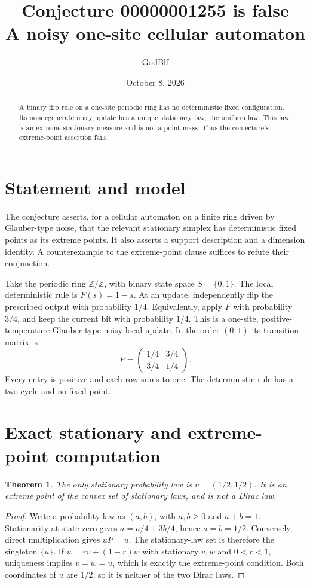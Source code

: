 \documentclass[10pt]{article}
\title{Conjecture 00000001255 is false\\A noisy one-site cellular automaton}
\author{GodBlf}
\date{October 8, 2026}
\newtheorem{theorem}{Theorem}
\begin{document}
\maketitle
\begin{abstract}
A binary flip rule on a one-site periodic ring has no deterministic fixed
configuration. Its nondegenerate noisy update has a unique stationary law,
the uniform law. This law is an extreme stationary measure and is not a
point mass. Thus the conjecture's extreme-point assertion fails.
\end{abstract}
\section{Statement and model}
The conjecture asserts, for a cellular automaton on a finite ring driven by
Glauber-type noise, that the relevant stationary simplex has deterministic
fixed points as its extreme points. It also asserts a support description
and a dimension identity. A counterexample to the extreme-point clause
suffices to refute their conjunction.

Take the periodic ring $\mathbb Z/\mathbb Z$, with binary state space
$S=\{0,1\}$. The local deterministic rule is $F(s)=1-s$.
At an update, independently flip the prescribed output with probability
$1/4$. Equivalently, apply $F$ with probability $3/4$, and keep the current
bit with probability $1/4$. This is a one-site, positive-temperature
Glauber-type noisy local update. In the order $(0,1)$ its transition matrix is
\[
 P=\begin{pmatrix}1/4&3/4\\3/4&1/4\end{pmatrix}.
\]
Every entry is positive and each row sums to one. The deterministic rule
has a two-cycle and no fixed point.

\section{Exact stationary and extreme-point computation}
\begin{theorem}
The only stationary probability law is $u=(1/2,1/2)$. It is an extreme
point of the convex set of stationary laws, and is not a Dirac law.
\end{theorem}
\begin{proof}
Write a probability law as $(a,b)$, with $a,b\geq0$ and $a+b=1$.
Stationarity at state zero gives
$a=a/4+3b/4$, hence $a=b=1/2$. Conversely, direct multiplication gives
$uP=u$. The stationary-law set is therefore the singleton $\{u\}$.
If $u=r v+(1-r)w$ with stationary $v,w$ and $0<r<1$, uniqueness implies
$v=w=u$, which is exactly the extreme-point condition. Both coordinates
of $u$ are $1/2$, so it is neither of the two Dirac laws.
\end{proof}
\end{document}
